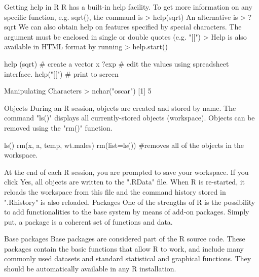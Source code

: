 \begin{frame}
\begin{frame}
\end{frame}
\begin{frame}

Getting help in R
R has a built-in help facility. To get more information on any specific function, e.g. sqrt(), the command is
> help(sqrt)
An alternative is
> ? sqrt
We can also obtain help on features specified by special characters.
The argument must be enclosed in single or double quotes (e.g. "[[")
> 
Help is also available in HTML format by running
> help.start()


\end{frame}
\begin{frame}
help (sqrt)   	      # create a vector x
?exp  	   		  # edit the values using spreadsheet interface.
help("[[")	         # print to screen

\end{frame}
\begin{frame}
Manipulating Characters
> nchar("oscar")
[1] 5

Objects
During an R session, objects are created and stored by name. The command "ls()" displays all currently-stored objects (workspace). Objects can be removed using the "rm()" function.

\end{frame}
\begin{frame}

ls()
rm(x, a, temp, wt.males)
rm(list=ls())								#removes all of the objects in the workspace.


At the end of each R session, you are prompted to save your workspace. If you click Yes, all objects are written to the ".RData" file. 
When R is re-started, it reloads the workspace from this file and the command history stored in ".Rhistory" is also reloaded.
Packages
One of the strengths of R is the possibility to add functionalities to the base system by means of add-on packages. Simply put, a package is a coherent set of functions and
data.
 


Base packages
Base packages are considered part of the R source code. These packages contain the basic functions that allow R to work, and include many commonly used datasets and standard statistical and graphical functions. They should be automatically available in any R installation.



\end{frame}
\end{frame}
